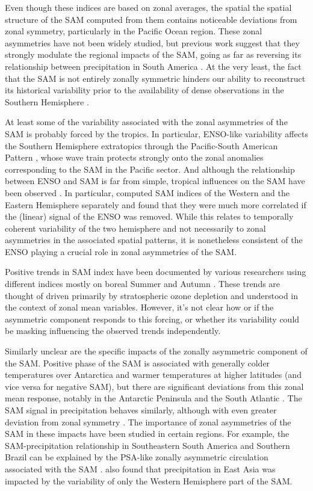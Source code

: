 \documentclass[]{ametsocV5}
\begin{document}
Even though these indices are based on zonal averages, the spatial the
spatial structure of the SAM computed from them contains noticeable
deviations from zonal symmetry, particularly in the Pacific Ocean
region. These zonal asymmetries have not been widely studied, but
previous work suggest that they strongly modulate the regional impacts
of the SAM, going as far as reversing its relationship between
precipitation in South America \citep{silvestri2009}. At the very least,
the fact that the SAM is not entirely zonally symmetric hinders our
ability to reconstruct its historical variability prior to the
availability of dense observations in the Southern Hemisphere
\citep{jones2009}.

At least some of the variability associated with the zonal asymmetries
of the SAM is probably forced by the tropics. In particular, ENSO-like
variability affects the Southern Hemisphere extratopics through the
Pacific-South American Pattern \citep{mo1987, kidson1988, karoly1989},
whose wave train protects strongly onto the zonal anomalies
corresponding to the SAM in the Pacific sector. And although the
relationship between ENSO and SAM is far from simple, tropical
influences on the SAM have been observed
\citep{fan2007, fogt2011, clem2013}. In particular, \citet{fan2007}
computed SAM indices of the Western and the Eastern Hemisphere
separately and found that they were much more correlated if the (linear)
signal of the ENSO was removed. While this relates to temporally
coherent variability of the two hemisphere and not necessarily to zonal
asymmetries in the associated spatial patterns, it is nonetheless
consistent of the ENSO playing a crucial role in zonal asymmetries of
the SAM.

Positive trends in SAM index have been documented by various researchers
using different indices mostly on boreal Summer and Autumn \citep[ and
references therein]{fogt2020}. These trends are thought of driven
primarily by stratospheric ozone depletion and understood in the context
of zonal mean variables. However, it's not clear how or if the
asymmetric component responds to this forcing, or whether its
variability could be masking influencing the observed trends
independently.

Similarly unclear are the specific impacts of the zonally asymmetric
component of the SAM. Positive phase of the SAM is associated with
generally colder temperatures over Antarctica and warmer temperatures at
higher latitudes \citep{jones2019} (and vice versa for negative SAM),
but there are significant deviations from this zonal mean response,
notably in the Antarctic Peninsula and the South Atlantic
\citep{fogt2012}. The SAM signal in precipitation behaves similarly,
although with even greater deviation from zonal symmetry
\citep{lim2016}. The importance of zonal asymmetries of the SAM in these
impacts have been studied in certain regions. For example, the
SAM-precipitation relationship in Southeastern South America and
Southern Brazil can be explained by the PSA-like zonally asymmetric
circulation associated with the SAM \citep{silvestri2009, rosso2018}.
\citet{fan2007} also found that precipitation in East Asia was impacted
by the variability of only the Western Hemisphere part of the SAM.
\end{document}
